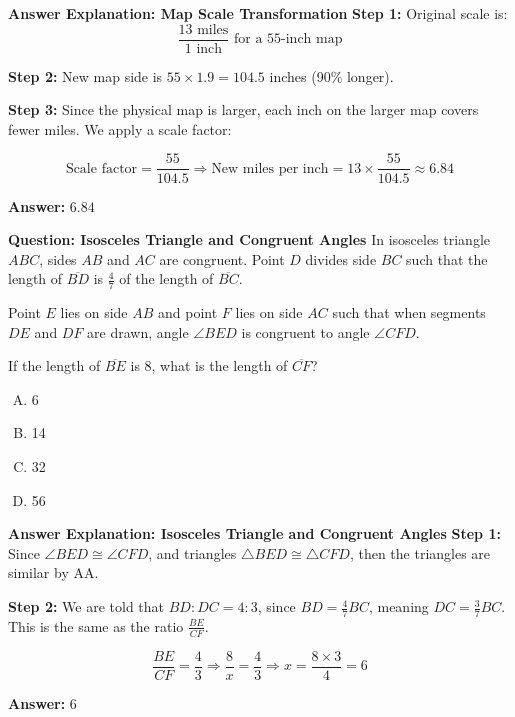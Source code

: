 \documentclass{beamer}
\begin{document}
\begin{frame}{\textbf{Answer Explanation: Map Scale Transformation}}
\textbf{Step 1:} Original scale is:
\[
\frac{13 \text{ miles}}{1 \text{ inch}} \text{ for a 55-inch map}
\]

\textbf{Step 2:} New map side is \( 55 \times 1.9 = 104.5 \) inches (90\% longer).

\pause

\textbf{Step 3:} Since the physical map is larger, each inch on the larger map covers fewer miles. We apply a scale factor:

\[
\text{Scale factor} = \frac{55}{104.5}
\Rightarrow \text{New miles per inch} = 13 \times \frac{55}{104.5} \approx 6.84
\]

\textbf{Answer:} \( \boxed{6.84} \)
\end{frame}


\begin{frame}{\textbf{Question: Isosceles Triangle and Congruent Angles}}
In isosceles triangle \( ABC \), sides \( AB \) and \( AC \) are congruent. Point \( D \) divides side \( BC \) such that the length of \( \overline{BD} \) is \( \frac{4}{7} \) of the length of \( \overline{BC} \).

Point \( E \) lies on side \( AB \) and point \( F \) lies on side \( AC \) such that when segments \( DE \) and \( DF \) are drawn, angle \( \angle BED \) is congruent to angle \( \angle CFD \).

If the length of \( \overline{BE} \) is 8, what is the length of \( \overline{CF} \)?

\begin{enumerate}[(A)]
    \item 6
    \item 14
    \item 32
    \item 56
\end{enumerate}
\end{frame}



\begin{frame}{\textbf{Answer Explanation: Isosceles Triangle and Congruent Angles}}
\textbf{Step 1:} Since \( \angle BED \cong \angle CFD \), and triangles \( \triangle BED \cong \triangle CFD \), then the triangles are similar by AA.

\pause

\textbf{Step 2:} We are told that \( BD : DC = 4 : 3 \), since \( BD = \frac{4}{7}BC \), meaning \( DC = \frac{3}{7}BC \). This is the same as the ratio \( \frac{BE}{CF} \).

\[
\frac{BE}{CF} = \frac{4}{3}
\Rightarrow \frac{8}{x} = \frac{4}{3} \Rightarrow x = \frac{8 \times 3}{4} = 6
\]

\textbf{Answer:} \( \boxed{6} \)
\end{frame}
\end{document}
